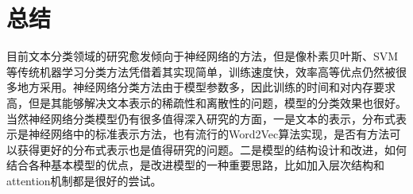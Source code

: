 \documentclass[UTF8]{ctexart}
\begin{document}
\section{总结}
	目前文本分类领域的研究愈发倾向于神经网络的方法，但是像朴素贝叶斯、SVM等传统机器学习分类方法凭借着其实现简单，训练速度快，效率高等优点仍然被很多地方采用。神经网络分类方法由于模型参数多，因此训练的时间和对内存要求高，但是其能够解决文本表示的稀疏性和离散性的问题，模型的分类效果也很好。当然神经网络分类模型仍有很多值得深入研究的方面，一是文本的表示，分布式表示是神经网络中的标准表示方法，也有流行的Word2Vec算法实现，是否有方法可以获得更好的分布式表示也是值得研究的问题。二是模型的结构设计和改进，如何结合各种基本模型的优点，是改进模型的一种重要思路，比如加入层次结构和attention机制都是很好的尝试。
\end{document}
